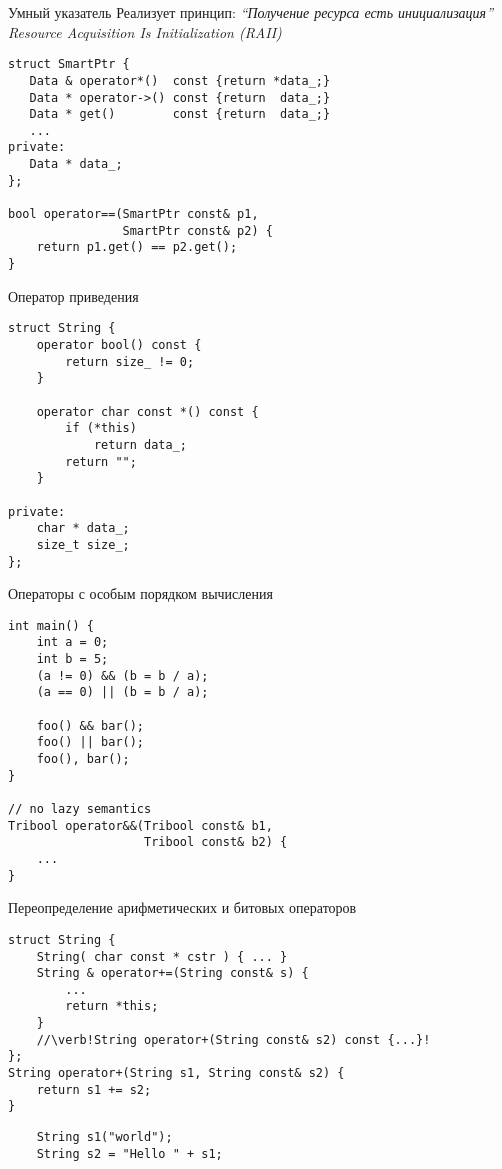 \documentclass{beamer}
\begin{document}
\begin{frame}[fragile]{Умный указатель}
Реализует принцип: {\em ``Получение ресурса есть инициализация''
Resource Acquisition Is Initialization (RAII)}
\begin{lstlisting}
struct SmartPtr {
   Data & operator*()  const {return *data_;}
   Data * operator->() const {return  data_;}
   Data * get()        const {return  data_;}
   ... 
private:
   Data * data_;
};

bool operator==(SmartPtr const& p1,
                SmartPtr const& p2) {
    return p1.get() == p2.get();
}
    \end{lstlisting}
\end{frame}

\begin{frame}[fragile]{Оператор приведения}
    \begin{lstlisting}
struct String {
    operator bool() const {
        return size_ != 0;
    }

    operator char const *() const {
        if (*this)
            return data_;
        return "";
    }

private:
    char * data_;
    size_t size_;
};
    \end{lstlisting}
\end{frame}

\begin{frame}[fragile]{Операторы с особым порядком вычисления}
    \begin{lstlisting}
int main() {
    int a = 0;
    int b = 5;
    (a != 0) && (b = b / a);
    (a == 0) || (b = b / a);

    foo() && bar();
    foo() || bar();
    foo(), bar();
}

// no lazy semantics
Tribool operator&&(Tribool const& b1, 
                   Tribool const& b2) { 
    ... 
}
    \end{lstlisting}
\end{frame}

\begin{frame}[fragile]{Переопределение арифметических и битовых операторов}
    \begin{lstlisting}
struct String {
    String( char const * cstr ) { ... }
    String & operator+=(String const& s) {
        ...
        return *this;    
    }
    //\verb!String operator+(String const& s2) const {...}!
};
String operator+(String s1, String const& s2) { 
    return s1 += s2; 
}
    \end{lstlisting}
    \begin{lstlisting}
    String s1("world");
    String s2 = "Hello " + s1;
    \end{lstlisting}
\end{frame}
\end{document}
